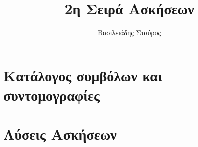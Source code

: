 \documentclass[twoside, openright, hidelinks, a4paper, 12pt]{book}%
\title{\color{teal}2η Σειρά Ασκήσεων}
\author{Βασιλειάδης Σταύρος}
\newcommand\AtPageUpperRight[1]{\AtPageUpperLeft{%
		\put(\LenToUnit{\paperwidth},\LenToUnit{0\paperheight}){#1}%
}}%
\newcommand\AtPageLowerRight[1]{\AtPageLowerLeft{%
		\put(\LenToUnit{\paperwidth},\LenToUnit{0\paperheight}){#1}%
}}%
\newcommand{\beautify}{%
	\AddToShipoutPictureBG{%
		\AtPageUpperLeft{\put(0,-25){\pgfornament[width=1.75cm]{61}}}
		\AtPageUpperRight{\put(-50,-25){\pgfornament[width=1.75cm,symmetry=v]{61}}}
		\AtPageLowerLeft{\put(0,25){\pgfornament[width=1.75cm,symmetry=h]{61}}}
		\AtPageLowerRight{\put(-50,25){\pgfornament[width=1.75cm,symmetry=c]{61}}}
	}
}
\newcommand{\simplify}{%
}
\begin{document}
	




\renewcommand{\contentsname}{Περιεχόμενα}
\renewcommand{\listfigurename}{Λίστα Σχημάτων}
\renewcommand{\listtablename}{Λίστα Πινάκων}
\renewcommand{\chaptername}{\centering{ΜΕΡΟΣ}}
\renewcommand{\appendixname}{Παράρτημα}
\renewcommand{\bibname}{Βιβλιογραφία}
\renewcommand\thesection{\color{violet}\arabic{section}}
\chapterfont{\color{magenta}}

\makeatletter
\newcommand*{\greek}[1]{%
	\expandafter\@greek\csname c@#1\endcsname
}
\newcommand*{\@greek}[1]{%
	$\ifcase#1\or\alpha\or\beta\or\gamma\or\delta\or\varepsilon
	\or\zeta\or\eta\or\theta\or\iota\or\kappa\or\lambda
	\or\mu\or\nu\or\xi\or o\or\pi\or\varrho\or\sigma
	\or\tau\or\upsilon\or\phi\or\chi\or\psi\or\omega
	\else\@ctrerr\fi$
}

\renewcommand{\thesubsection}{\thesection\;-\;\greek{subsection}}


\setlength{\parskip}{0.5em}     %


\setlength{\parskip}{1em}       %
\begingroup
\pagestyle{empty}

	\tableofcontents
\endgroup

	\clearpage

	\cleardoublepage
\doublespacing
\chapter{Κατάλογος συμβόλων και συντομογραφίες}
\label{ch:ChapterName}
\simplify
	
\clearpage

\cleardoublepage
\setcounter{page}{1}
	\chapter{Λύσεις Ασκήσεων}
	\label{ch:ChapterName}
	\simplify


	
	
	
	\newpage
\end{document}
